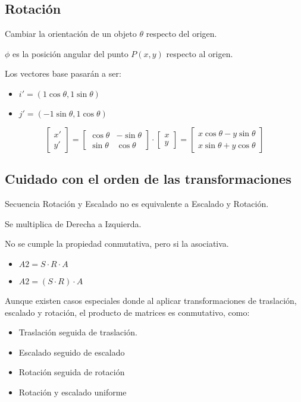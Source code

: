 \subsection{Rotación}
Cambiar la orientación de un objeto $\theta$ respecto del origen.

$\phi$ es la posición angular del punto $P(x, y)$ respecto al origen.

Los vectores base pasarán a ser:
\begin{itemize}
	\item $i'=(1 \cos \theta , 1 \sin \theta)$
	\item $j'=(-1 \sin \theta, 1 \cos \theta)$
\end{itemize}

$$\left[\begin{matrix}
			x' \\ y'
		\end{matrix}\right] =
	\left[\begin{matrix}
			\cos \theta & - \sin \theta \\ \sin \theta & \cos \theta
		\end{matrix}\right] \cdot
	\left[\begin{matrix}
			x \\ y
		\end{matrix}\right]=
	\left[\begin{matrix}
			x \cos \theta - y \sin \theta \\ x \sin \theta + y \cos \theta
		\end{matrix}\right]$$

\subsection{Cuidado con el orden de las transformaciones}
Secuencia Rotación y Escalado no es equivalente a Escalado y Rotación.

Se multiplica de Derecha a Izquierda.

No se cumple la propiedad conmutativa, pero si la asociativa.
\begin{itemize}
	\item $A2 = S \cdot R \cdot A$
	\item $A2 = (S \cdot R) \cdot A$
\end{itemize}

Aunque existen casos especiales donde al aplicar transformaciones de traslación, escalado y rotación, el producto de matrices es conmutativo, como:
\begin{itemize}
	\item Traslación seguida de traslación.
	\item Escalado seguido de escalado
	\item Rotación seguida de rotación
	\item Rotación y escalado uniforme
\end{itemize}

